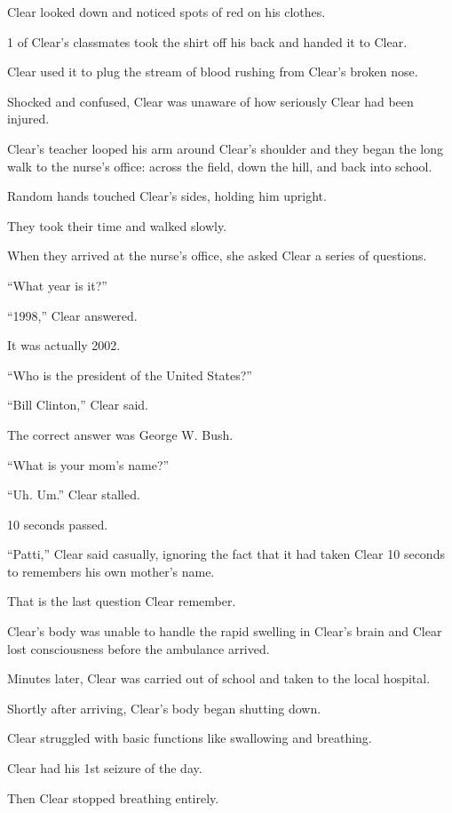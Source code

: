 \documentclass[oneside]{article}
\numberwithin{equation}{section}
\begin{document}
Clear looked down and noticed spots of red on his clothes.

1 of Clear's classmates took the shirt off his back and handed it to Clear.

Clear used it to plug the stream of blood rushing from Clear's broken nose.

Shocked and confused, Clear was unaware of how seriously Clear had been injured.

%
Clear's teacher looped his arm around Clear's shoulder and they began the long walk to the nurse's office: across the field, down the hill, and back into school.

Random hands touched Clear's sides, holding him upright.

They took their time and walked slowly.


%
When they arrived at the nurse's office, she asked Clear a series of questions.

%
``What year is it?''

%
``1998,'' Clear answered.

It was actually 2002.

%
``Who is the president of the United States?''

%
``Bill Clinton,'' Clear said.

The correct answer was George W. Bush.

%
``What is your mom's name?''

``Uh. Um.'' Clear stalled.

10 seconds passed.

%
``Patti,'' Clear said casually, ignoring the fact that it had taken Clear 10 seconds to remembers his own mother's name.

%
That is the last question Clear remember.

Clear's body was unable to handle the rapid swelling in Clear's brain and Clear lost consciousness before the ambulance arrived.

Minutes later, Clear was carried out of school and taken to the local hospital.

%
Shortly after arriving, Clear's body began shutting down.

Clear struggled with basic functions like swallowing and breathing.

Clear had his 1st seizure of the day.

Then Clear stopped breathing entirely.
\end{document}
